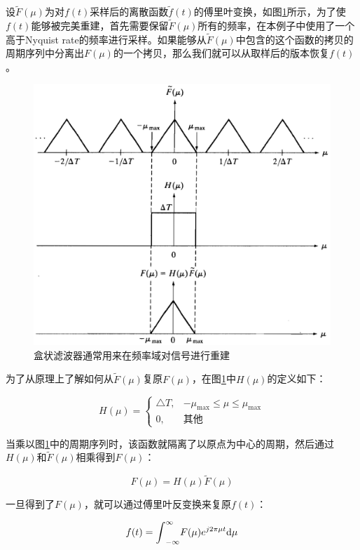 设$\tilde{F}(\mu)$为对$f(t)$采样后的离散函数$\tilde{f}(t)$的傅里叶变换，如图\ref{f:intro-reconstruction}所示，为了使$f(t)$能够被完美重建，首先需要保留$\tilde{F}(\mu)$所有的频率，在本例子中使用了一个高于Nyquist rate的频率进行采样。如果能够从$\tilde{F}(\mu)$中包含的这个函数的拷贝的周期序列中分离出$F(\mu)$的一个拷贝，那么我们就可以从取样后的版本恢复$f(t)$。

\begin{figure}
\sidecaption
	\includegraphics[width=.65\textwidth]{figures/intro/reconstruction}
	\caption{盒状滤波器通常用来在频率域对信号进行重建}
	\label{f:intro-reconstruction}
\end{figure}

为了从原理上了解如何从$\tilde{F}(\mu)$复原$F(\mu)$，在图\ref{f:intro-reconstruction}中$H(\mu)$的定义如下：

\begin{equation}
	H(\mu)=\begin{cases}
		\triangle T, & -\mu_{\max}\leq\mu\leq\mu_{\max}\\
		0,           & 其他
	\end{cases}
\end{equation}

\noindent 当乘以图\ref{f:intro-reconstruction}中的周期序列时，该函数就隔离了以原点为中心的周期，然后通过$H(\mu)$和$\tilde{F}(\mu)$相乘得到$F(\mu)$：

\begin{equation}\label{eq:intro-reconstruction}
	F(\mu)=H(\mu)\tilde{F}(\mu)
\end{equation}

\noindent 一旦得到了$F(\mu)$，就可以通过傅里叶反变换来复原$f(t)$：

\begin{equation}
	f(t)={\rm \int}^{\infty}_{-\infty}F(\mu)e^{j2\pi\mu t} {\rm d}\mu
\end{equation}


